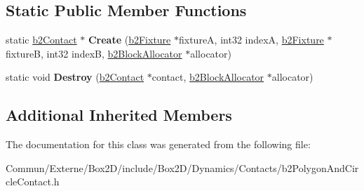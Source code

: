 \subsection*{Static Public Member Functions}
\begin{DoxyCompactItemize}
\item 
static \hyperlink{classb2_contact}{b2\+Contact} $\ast$ {\bfseries Create} (\hyperlink{classb2_fixture}{b2\+Fixture} $\ast$fixtureA, int32 indexA, \hyperlink{classb2_fixture}{b2\+Fixture} $\ast$fixtureB, int32 indexB, \hyperlink{classb2_block_allocator}{b2\+Block\+Allocator} $\ast$allocator)\hypertarget{classb2_polygon_and_circle_contact_a0ff5b8e7167146b5716bce55365b7fc3}{}\label{classb2_polygon_and_circle_contact_a0ff5b8e7167146b5716bce55365b7fc3}

\item 
static void {\bfseries Destroy} (\hyperlink{classb2_contact}{b2\+Contact} $\ast$contact, \hyperlink{classb2_block_allocator}{b2\+Block\+Allocator} $\ast$allocator)\hypertarget{classb2_polygon_and_circle_contact_a666779f20aa3b57cfc0c60e3ac235f6b}{}\label{classb2_polygon_and_circle_contact_a666779f20aa3b57cfc0c60e3ac235f6b}

\end{DoxyCompactItemize}
\subsection*{Additional Inherited Members}


The documentation for this class was generated from the following file\+:\begin{DoxyCompactItemize}
\item 
Commun/\+Externe/\+Box2\+D/include/\+Box2\+D/\+Dynamics/\+Contacts/b2\+Polygon\+And\+Circle\+Contact.\+h\end{DoxyCompactItemize}
